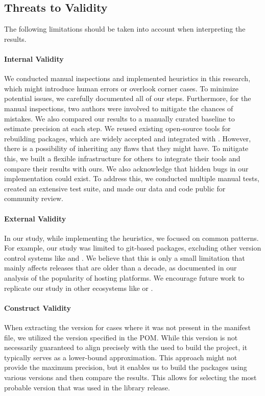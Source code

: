 \documentclass[smallextended]{svjour3}
\newcommand{\maven}[1]{\tool{Maven{#1}}}
\newcommand{\java}{\tool{Java}}
\begin{document}
\subsection{Threats to Validity}
The following limitations should be taken into account when interpreting the results. 

\paragraph{Internal Validity}
We conducted manual inspections and implemented heuristics in this research, which might introduce human errors or overlook corner cases. To minimize potential issues, we carefully documented all of our steps. Furthermore, for the manual inspections, two authors were involved to mitigate the chances of mistakes. We also compared our results to a manually curated baseline to estimate precision at each step.
We reused existing open-source tools for rebuilding packages, which are widely accepted and integrated with \maven{}.
However, there is a possibility of inheriting any flaws that they might have. To mitigate this, we built a flexible infrastructure for others to integrate their tools and compare their results with ours. We also acknowledge that hidden bugs in our implementation could exist. To address this, we conducted multiple manual tests, created an extensive test suite, and made our data and code public for community review. 

\paragraph{External Validity}
In our study, while implementing the heuristics, we focused on common patterns. For example, our study was limited to git-based packages, excluding other version control systems like  and . We believe that this is only a small limitation that mainly affects releases that are older than a decade, as documented in our analysis of the popularity of hosting platforms.
We encourage future work to replicate our study in other ecosystems like  or .

\paragraph{Construct Validity}
When extracting the  version for cases where it was not present in the manifest file, we utilized the \java{} version specified in the POM. While this version is not necessarily guaranteed to align precisely with the  used to build the project, it typically serves as a lower-bound approximation. This approach might not provide the maximum precision, but it enables us to build the packages using various versions and then compare the results. This allows for selecting the most probable version that was used in the library release.
\end{document}
